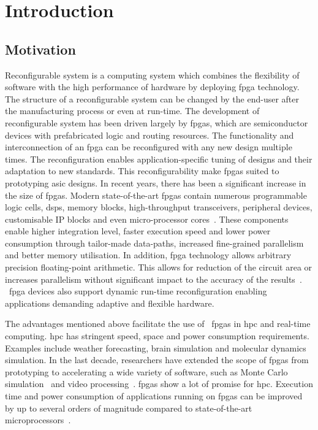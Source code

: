 
\chapter{Introduction}

\label{ch:introduction}

\section{Motivation}

Reconfigurable system is a computing system which combines the flexibility of software with the high performance of hardware by deploying \gls{fpga} technology.
The structure of a reconfigurable system can be changed by the end-user after the manufacturing process or even at run-time.
The development of reconfigurable system has been driven largely by \glspl{fpga}, which are semiconductor devices with prefabricated logic and routing resources.
The functionality and interconnection of an \gls{fpga} can be reconfigured with any new design multiple times.
The reconfiguration enables application-specific tuning of designs and their adaptation to new standards.
This reconfigurability make \glspl{fpga} suited to prototyping \gls{asic} designs.
In recent years, there has been a significant increase in the size of \glspl{fpga}.
Modern state-of-the-art \glspl{fpga} contain numerous programmable logic cells, \glspl{dsp}, memory blocks, high-throughput transceivers, peripheral devices, customisable IP blocks and even micro-processor cores~\cite{alterasoc,xilinxzynq}.
These components enable higher integration level, faster execution speed and lower power consumption through tailor-made data-paths, increased fine-grained parallelism and better memory utilisation.
In addition, \gls{fpga} technology allows arbitrary precision floating-point arithmetic.
This allows for reduction of the circuit area or increases parallelism without significant impact to the accuracy of the results~\cite{chow11,chow12}.
~\gls{fpga} devices also support dynamic run-time reconfiguration enabling applications demanding adaptive and flexible hardware. 

The advantages mentioned above facilitate the use of ~\glspl{fpga} in \gls{hpc} and real-time computing.
\gls{hpc} has stringent speed, space and power consumption requirements.
Examples include weather forecasting, brain simulation and molecular dynamics simulation. 
In the last decade, researchers have extended the scope of \glspl{fpga} from prototyping to accelerating a wide variety of software, such as Monte Carlo simulation~\cite{chow12} and video processing~\cite{guo04}.
\glspl{fpga} show a lot of promise for \gls{hpc}.
Execution time and power consumption of applications running on \glspl{fpga} can be improved by up to several orders of magnitude compared to state-of-the-art microprocessors~\cite{chow11,chow12,craven07,guo04,pell11}.

